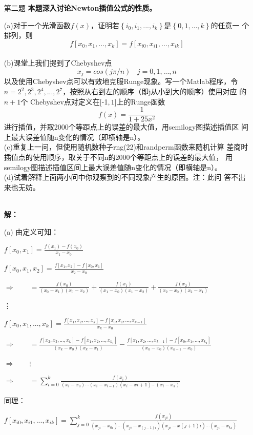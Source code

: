 \documentclass[12pt,a4paper,UTF8]{ctexart}
\begin{document}
\begin{enumerate}
\item[第二题] \textbf{本题深入讨论Newton插值公式的性质。}
 
(a)对于一个光滑函数$f(x)$，证明若$\left\{i_0, i_1, ..., i_k\right\}$是$\left\{0, 1, ..., k\right\}$的任意一
个排列，则$$f[x_0, x_1, ..., x_k] = f[x_{i0}, x_{i1}, ..., x_{ik}]$$\\
(b)课堂上我们提到了Chebyshev点$$x_j = cos(j\pi/n)~~~~j = 0, 1, ..., n$$
以及使用Chebyshev点可以有效地克服Runge现象。写一个Matlab程序，令
$n = 2^{2}, 2^{3}, 2^{4}, ..., 2^{7}$，按照从右到左的顺序（即j从小到大的顺序）使用对应
的$n + 1$个
Chebyshev点对定义在$[$\textnormal{-}1$,1]$上的Runge函数$$f(x) = \frac{1}{1 + 25x^{2}}$$
进行插值，并取2000个等距点上的误差的最大值，用semilogy图描述插值区
间上最大误差值随n变化的情况（即横轴是n）。\\
(c)重复上一问，但使用随机数种子rng(22)和randperm函数来随机计算
差商时插值点的使用顺序，取关于不同n的2000个等距点上的误差的最大值，
用semilogy图描述插值区间上最大误差值随n变化的情况（即横轴是n）。\\
(d)试着解释上面两小问中你观察到的不同现象产生的原因。注：此问
答不出来也无妨。
\\~

\textbf{\LARGE 解：}

(a) 由定义可知：

\qquad $f[x_0,x_1] = \frac{f(x_1)-f(x_0)}{x_1 - x_0}$

\qquad $f[x_0,x_1,x_2] = \frac{f[x_1,x_2]-f[x_0,x_1]}{x_2 - x_0}$

\qquad \qquad $\Rightarrow \qquad = \frac{f(x_0)}{(x_0-x_1)(x_0-x_2)} + \frac{f(x_1)}{(x_1-x_0)(x_1-x_2)} + \frac{f(x_2)}{(x_2-x_0)(x_2-x_1)}$

\qquad \qquad \vdots

\qquad $f[x_0,x_1,...,x_k] = \frac{f[x_1,x_2,...,x_k]-f[x_0,x_1,...,x_{k-1}]}{x_k - x_0}$

\qquad \qquad $\Rightarrow \qquad = \frac{f[x_2,x_3,...,x_k]-f[x_1,x_2,...,x_{k_1}]}{(x_k-x_0)(x_k-x_1)} - \frac{f[x_1,x_2,...,x_{k-1}]-f[x_0,x_1,...,x_{k_2}]}{(x_k-x_0)(x_{k-1}-x_0)}$

\qquad \qquad $\Rightarrow \qquad \vdots$

\qquad \qquad $\Rightarrow \qquad = \sum_{i = 0}^{k} \frac{f(x_i)}{(x_i-x_0)\cdots(x_i-x_{i-1})(x_i-x{i+1})\cdots(x_i-x_k)}$

同理：

\qquad $f[x_{i0},x_{i1},...,x_{ik}] = \sum_{j = 0}^{k} \frac{f(x_{ji})}{(x_{ji}-x_{0i})\cdots(x_{ji}-x_{(j-1)i})(x_{ji}-x{(j+1)i})\cdots(x_{ji}-x_{ki})}$\\


\end{enumerate}
\end{document}
